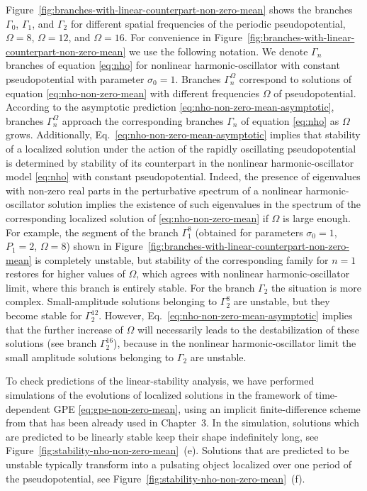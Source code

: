 Figure~\ref{fig:branches-with-linear-counterpart-non-zero-mean} shows the branches $\Gamma_0$, $\Gamma_1$, and $\Gamma_2$ for different spatial frequencies of the periodic pseudopotential, $\Omega = 8$, $\Omega = 12$, and $\Omega = 16$.
For convenience in Figure~\ref{fig:branches-with-linear-counterpart-non-zero-mean} we use the following notation.
We denote $\Gamma_n$ branches of equation \eqref{eq:nho} for nonlinear harmonic-oscillator with constant pseudopotential with parameter $\sigma_0 = 1$.
Branches $\Gamma_n^{\Omega}$ correspond to solutions of equation \eqref{eq:nho-non-zero-mean} with different frequencies $\Omega$ of pseudopotential.
According to the asymptotic prediction \eqref{eq:nho-non-zero-mean-asymptotic}, branches $\Gamma_n^{\Omega}$ approach the corresponding branches $\Gamma_n$ of equation \eqref{eq:nho} as $\Omega$ grows.
Additionally, Eq.~\eqref{eq:nho-non-zero-mean-asymptotic} implies that stability of a localized solution under the action of the rapidly oscillating pseudopotential is determined by stability of its counterpart in the nonlinear harmonic-oscillator model \eqref{eq:nho} with constant pseudopotential.
Indeed, the presence of eigenvalues with non-zero real parts in the perturbative spectrum of a nonlinear harmonic-oscillator solution implies the existence of such eigenvalues in the spectrum of the corresponding localized solution of \eqref{eq:nho-non-zero-mean} if $\Omega$ is large enough.
For example, the segment of the branch $\Gamma_1^8$ (obtained for parameters $\sigma_0 = 1$, $P_1 = 2$, $\Omega = 8$) shown in Figure~\ref{fig:branches-with-linear-counterpart-non-zero-mean} is completely unstable, but stability of the corresponding family for $n = 1$ restores for higher values of $\Omega$, which agrees with nonlinear harmonic-oscillator limit, where this branch is entirely stable.
For the branch $\Gamma_2$ the situation is more complex.
Small-amplitude solutions belonging to $\Gamma_2^8$ are unstable, but they become stable for $\Gamma_2^{12}$.
However, Eq.~\eqref{eq:nho-non-zero-mean-asymptotic} implies that the further increase of $\Omega$ will necessarily leads to the destabilization of these solutions (see branch $\Gamma_2^{16}$), because in the nonlinear harmonic-oscillator limit the small amplitude solutions belonging to $\Gamma_2$ are unstable.

To check predictions of the linear-stability analysis, we have performed simulations of the evolutions of localized solutions in the framework of time-dependent GPE \eqref{eq:gpe-non-zero-mean}, using an implicit finite-difference scheme from \cite{TrofimovPeskov} that has been already used in Chapter~3.
In the simulation, solutions which are predicted to be linearly stable keep their shape indefinitely long, see Figure~\ref{fig:stability-nho-non-zero-mean}~(e).
Solutions that are predicted to be unstable typically transform into a pulsating object localized over one period of the pseudopotential, see Figure~\ref{fig:stability-nho-non-zero-mean}~(f).

